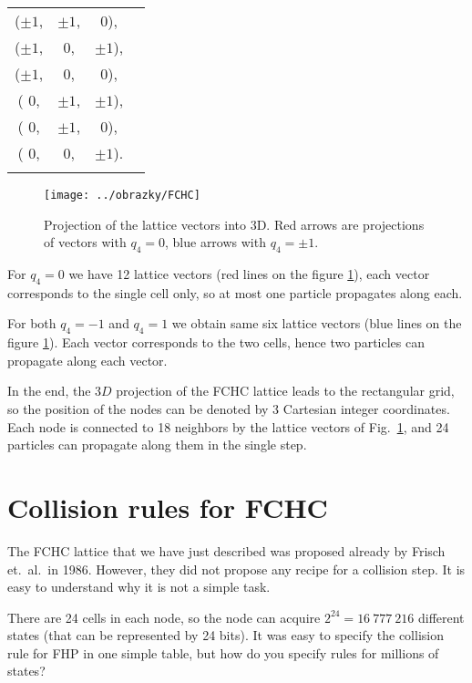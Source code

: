 \begin{tabular}{cccc}
\\
($\pm 1$,& $\pm 1$,& $0$),\\
($\pm 1$,& $0$,& $\pm 1$),\\
($\pm 1$,& $0$,& $0$),\\
( $0$,& $\pm 1$,& $\pm 1$),\\
( $0$,& $\pm 1$,& $0$),\\
( $0$,& $0$,& $\pm 1$).\\
\\
\end{tabular}

\begin{figure}
 \centering
 \texttt{[image: ../obrazky/FCHC]}
 \label{fchc}
 \caption{Projection of the lattice vectors into 3D. Red arrows are projections of vectors with $q_4 = 0$,
 blue arrows with $q_4 = \pm 1$.}
\end{figure}

For $q_4 = 0$ we have 12 lattice vectors (red lines on the figure \ref{fchc}), each vector corresponds to the single cell only, so at most one particle propagates along each.

For both $q_4 = -1$ and $q_4 = 1$ we obtain same six lattice vectors (blue lines on the figure \ref{fchc}). Each vector corresponds to the two cells, hence two particles can propagate along each vector.

In the end, the $3D$ projection of the FCHC lattice leads to the rectangular grid, so the position of the nodes can be denoted by 3 Cartesian integer coordinates.
Each node is connected to 18 neighbors by the lattice vectors of Fig.\ \ref{fchc}, and 24 particles can propagate along them in the single step.

\section{Collision rules for FCHC}

The FCHC lattice that we have just described was proposed already by Frisch et.\ al.\ in 1986.
However, they did not propose any recipe for a collision step. It is easy to understand why it is not a simple task.

There are 24 cells in each node, so the node can acquire $2^{24} = 16~777~216$ different states (that can be represented by 24 bits). It was easy to specify the collision rule for FHP in one simple table, but how do you specify rules for millions of states?

